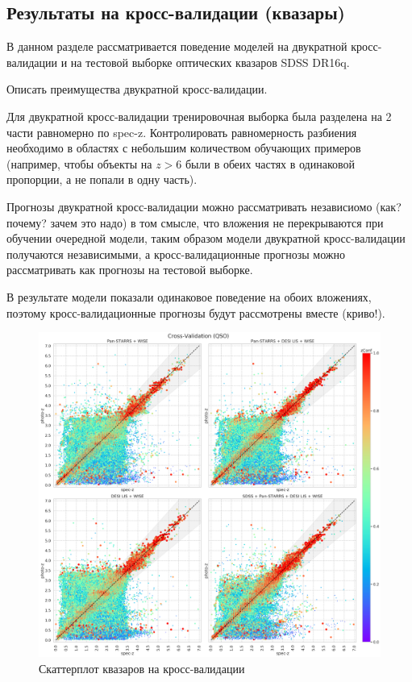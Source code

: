 \documentclass[fleqn,usenatbib]{mnras}
\begin{document}
\subsection{Результаты на кросс-валидации (квазары)}
В данном разделе рассматривается поведение моделей на двукратной кросс-валидации и на тестовой выборке оптических квазаров SDSS DR16q.

Описать преимущества двукратной кросс-валидации.

Для двукратной кросс-валидации тренировочная выборка была разделена на 2 части равномерно по spec-z. Контролировать равномерность разбиения необходимо в областях с небольшим количеством обучающих примеров (например, чтобы объекты на $z > 6$ были в обеих частях в одинаковой пропорции, а не попали в одну часть).

Прогнозы двукратной кросс-валидации можно рассматривать независиомо (как? почему? зачем это надо) в том смысле, что вложения не перекрываются при обучении очередной модели, таким образом модели двукратной кросс-валидации получаются независимыми, а кросс-валидационные прогнозы можно рассматривать как прогнозы на тестовой выборке.

В результате модели показали одинаковое поведение на обоих вложениях, поэтому кросс-валидационные прогнозы будут рассмотрены вместе (криво!).

\begin{figure}
    \centering
    \includegraphics[width=0.9\linewidth]{images/scatterplots-cv2-qso.png}
    \caption{Скаттерплот квазаров на кросс-валидации}
    \label{fig:my_label}
\end{figure}
\end{document}
